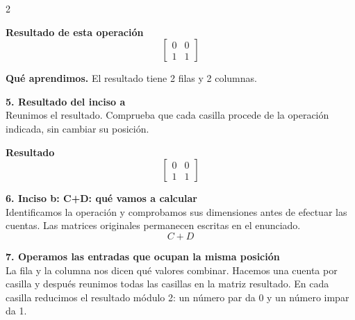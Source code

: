 \documentclass[11pt,a4paper,landscape]{article}
\begin{document}
\begin{multicols*}{2}
\begin{minipage}{\linewidth}
\par\smallskip \textbf{Resultado de esta operación}\[\begin{bmatrix}0 & 0\\1 & 1\end{bmatrix}\]
\par\smallskip\textbf{Qué aprendimos.} El resultado tiene 2 filas y 2 columnas.
\end{minipage}\par\medskip
\noindent\begin{minipage}{\linewidth}\textbf{5. Resultado del inciso a}\\[2pt]Reunimos el resultado. Comprueba que cada casilla procede de la operación indicada, sin cambiar su posición.
\par\smallskip \textbf{Resultado}\[\begin{bmatrix}0 & 0\\1 & 1\end{bmatrix}\]
\end{minipage}\par\medskip
\noindent\begin{minipage}{\linewidth}\textbf{6. Inciso b: C+D: qué vamos a calcular}\\[2pt]Identificamos la operación y comprobamos sus dimensiones antes de efectuar las cuentas. Las matrices originales permanecen escritas en el enunciado.
\[C+D\]
\end{minipage}\par\medskip
\noindent\begin{minipage}{\linewidth}\textbf{7. Operamos las entradas que ocupan la misma posición}\\[2pt]La fila y la columna nos dicen qué valores combinar. Hacemos una cuenta por casilla y después reunimos todas las casillas en la matriz resultado. En cada casilla reducimos el resultado módulo 2: un número par da 0 y un número impar da 1.
\par{}\par\smallskip

\end{minipage}
\end{multicols*}
\end{document}
